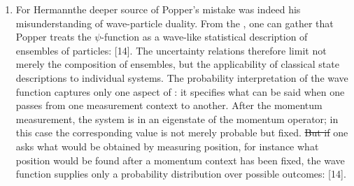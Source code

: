 \documentclass[pdflatex]{sn-jnl}
\newcommand{\LdF}{\bt{Logik der Forschung}\xspace}
\newcommand{\UR}{uncertainty relations\xspace}
\providecommand{\DIFadd}[1]{{\protect\color{blue}\uwave{#1}}} %
\providecommand{\DIFdel}[1]{{\protect\color{red}\sout{#1}}}                      %
\providecommand{\DIFaddbegin}{} %
\providecommand{\DIFaddend}{} %
\providecommand{\DIFdelbegin}{} %
\providecommand{\DIFdelend}{} %
\begin{document}
\begin{enumerate}
\item For Hermann\DIFaddbegin \DIFadd{, }\DIFaddend the deeper source of Popper's mistake was indeed his misunderstanding of wave-particle duality. From the \LdF, one can gather that Popper treats the $\psi$-function as a wave-like statistical description of ensembles of particles:  [14]. The \UR therefore limit not merely the composition of ensembles, but the applicability of classical state descriptions to individual systems. The probability interpretation of the wave function captures only one aspect of \qm: it specifies what can be said when one passes from one measurement context to another. After the momentum measurement, the system is in an eigenstate of the momentum operator; in this case the corresponding value is not merely probable but fixed. \DIFdelbegin \DIFdel{But if }\DIFdelend \DIFaddbegin \DIFadd{If, however, }\DIFaddend one asks what would be obtained by measuring position, for instance what position would be found after a momentum context has been fixed, the wave function supplies only a probability distribution over possible outcomes:  [14].



\end{enumerate}
\end{document}
